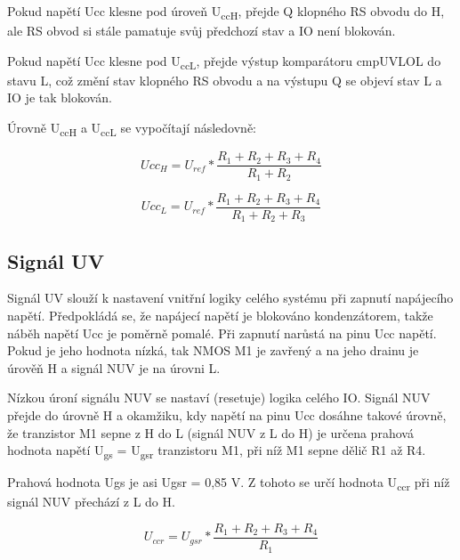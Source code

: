 Pokud napětí Ucc klesne pod úroveň U\textsubscript{ccH}, přejde Q klopného RS obvodu do H, ale RS obvod si stále pamatuje svůj předchozí stav a IO není blokován. 

Pokud napětí Ucc klesne pod U\textsubscript{ccL}, přejde výstup komparátoru cmpUVLOL do stavu L, což změní stav klopného RS obvodu a na výstupu Q se objeví stav L a IO je tak blokován. 

Úrovně U\textsubscript{ccH} a U\textsubscript{ccL} se vypočítají následovně:

\begin{equation}
Ucc_{H} = U_{ref}*\frac{R_{1}+R_{2}+R_{3}+R_{4}}{R_{1}+R_{2}}
\end{equation}

\begin{equation}
Ucc_{L} = U_{ref}*\frac{R_{1}+R_{2}+R_{3}+R_{4}}{R_{1}+R_{2}+R_{3}}
\end{equation}

\subsection{Signál UV}
Signál UV slouží k nastavení vnitřní logiky celého systému při zapnutí napájecího napětí. Předpokládá se, že napájecí napětí je blokováno kondenzátorem, takže náběh napětí Ucc je poměrně pomalé. Při zapnutí narůstá na pinu Ucc napětí. Pokud je jeho hodnota nízká, tak NMOS M1 je zavřený a na jeho drainu je úrověň H a signál NUV je na úrovni L.

Nízkou úroní signálu NUV se nastaví (resetuje) logika celého IO. Signál NUV přejde do úrovně H a okamžiku, kdy napětí na pinu Ucc dosáhne takové úrovně, že tranzistor M1 sepne z H do L (signál NUV z L do H) je určena prahová hodnota napětí U\textsubscript{gs} = U\textsubscript{gsr} tranzistoru M1, při níž M1 sepne dělič R1 až R4.

Prahová hodnota Ugs je asi Ugsr = 0,85 V. Z tohoto se určí hodnota U\textsubscript{ccr} při níž signál NUV přechází z L do H.

\begin{equation}
U_{ccr} = U_{gsr}*\frac{R_{1}+R_{2}+R_{3}+R_{4}}{R_{1}}
\end{equation}
